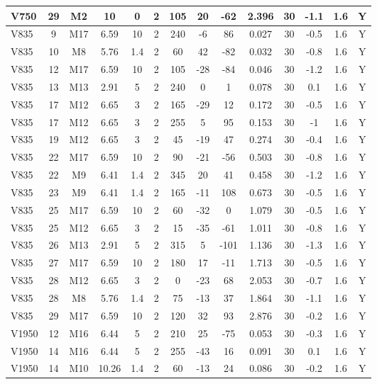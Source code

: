 \documentclass{article}
\begin{document}
\begin{center}
\begin{longtable}{|l|c|c|c|c|c|c|c|c|c|c|c|c|c|}
V750	&	29	&	M2	&	10	&	0	&	2	&	105	&	20	&	-62	&	2.396	&	30	&	-1.1	&	1.6	&	Y	\\\hline
V835	&	9	&	M17	&	6.59	&	10	&	2	&	240	&	-6	&	86	&	0.027	&	30	&	-0.5	&	1.6	&	Y	\\\hline
V835	&	10	&	M8	&	5.76	&	1.4	&	2	&	60	&	42	&	-82	&	0.032	&	30	&	-0.8	&	1.6	&	Y	\\\hline
V835	&	12	&	M17	&	6.59	&	10	&	2	&	105	&	-28	&	-84	&	0.046	&	30	&	-1.2	&	1.6	&	Y	\\\hline
V835	&	13	&	M13	&	2.91	&	5	&	2	&	240	&	0	&	1	&	0.078	&	30	&	0.1	&	1.6	&	Y	\\\hline
V835	&	17	&	M12	&	6.65	&	3	&	2	&	165	&	-29	&	12	&	0.172	&	30	&	-0.5	&	1.6	&	Y	\\\hline
V835	&	17	&	M12	&	6.65	&	3	&	2	&	255	&	5	&	95	&	0.153	&	30	&	-1	&	1.6	&	Y	\\\hline
V835	&	19	&	M12	&	6.65	&	3	&	2	&	45	&	-19	&	47	&	0.274	&	30	&	-0.4	&	1.6	&	Y	\\\hline
V835	&	22	&	M17	&	6.59	&	10	&	2	&	90	&	-21	&	-56	&	0.503	&	30	&	-0.8	&	1.6	&	Y	\\\hline
V835	&	22	&	M9	&	6.41	&	1.4	&	2	&	345	&	20	&	41	&	0.458	&	30	&	-1.2	&	1.6	&	Y	\\\hline
V835	&	23	&	M9	&	6.41	&	1.4	&	2	&	165	&	-11	&	108	&	0.673	&	30	&	-0.5	&	1.6	&	Y	\\\hline
V835	&	25	&	M17	&	6.59	&	10	&	2	&	60	&	-32	&	0	&	1.079	&	30	&	-0.5	&	1.6	&	Y	\\\hline
V835	&	25	&	M12	&	6.65	&	3	&	2	&	15	&	-35	&	-61	&	1.011	&	30	&	-0.8	&	1.6	&	Y	\\\hline
V835	&	26	&	M13	&	2.91	&	5	&	2	&	315	&	5	&	-101	&	1.136	&	30	&	-1.3	&	1.6	&	Y	\\\hline
V835	&	27	&	M17	&	6.59	&	10	&	2	&	180	&	17	&	-11	&	1.713	&	30	&	-0.5	&	1.6	&	Y	\\\hline
V835	&	28	&	M12	&	6.65	&	3	&	2	&	0	&	-23	&	68	&	2.053	&	30	&	-0.7	&	1.6	&	Y	\\\hline
V835	&	28	&	M8	&	5.76	&	1.4	&	2	&	75	&	-13	&	37	&	1.864	&	30	&	-1.1	&	1.6	&	Y	\\\hline
V835	&	29	&	M17	&	6.59	&	10	&	2	&	120	&	32	&	93	&	2.876	&	30	&	-0.2	&	1.6	&	Y	\\\hline
V1950	&	12	&	M16	&	6.44	&	5	&	2	&	210	&	25	&	-75	&	0.053	&	30	&	-0.3	&	1.6	&	Y	\\\hline
V1950	&	14	&	M16	&	6.44	&	5	&	2	&	255	&	-43	&	16	&	0.091	&	30	&	0.1	&	1.6	&	Y	\\\hline
V1950	&	14	&	M10	&	10.26	&	1.4	&	2	&	60	&	-13	&	24	&	0.086	&	30	&	-0.2	&	1.6	&	Y	\\\hline

\end{longtable}
\end{center}
\end{document}
